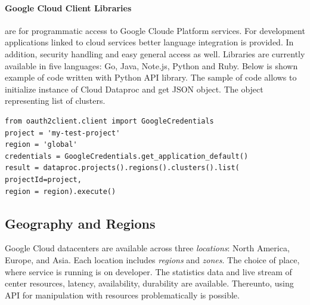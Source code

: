 \documentclass[a4paper,12pt,oneside]{report}
\begin{document}
	\paragraph{Google Cloud Client Libraries} are for programmatic access to Google
	Cloude Platform services. For development applications 
	linked to cloud services better language integration is provided. In addition,
	security handling and easy general access as well. Libraries are currently 
	available in five languages: Go, Java, Note.js, Python and Ruby. Below is shown 
	example of code written with Python API library.  The sample of code allows to
	initialize  
	instance of Cloud Dataproc and get JSON object. The object representing list of
	clusters.
	
	\begin{footnotesize}
		\begin{lstlisting}[style=python]
from oauth2client.client import GoogleCredentials
project = 'my-test-project'
region = 'global'
credentials = GoogleCredentials.get_application_default()
result = dataproc.projects().regions().clusters().list(
projectId=project,
region = region).execute()
		\end{lstlisting}\end{footnotesize}
	
	
	
	\subsection{Geography and Regions}
	Google Cloud datacenters are available across three \textit{locations}: North
	America, Europe, and Asia. Each location includes 
	\textit{regions} and \textit{zones}. The choice of place, where service is
	running is on developer. The statistics data and live stream of 
	center resources, latency, availability, durability are available. Thereunto,
	using API  for manipulation with resources problematically is possible. 
	
\end{document}
